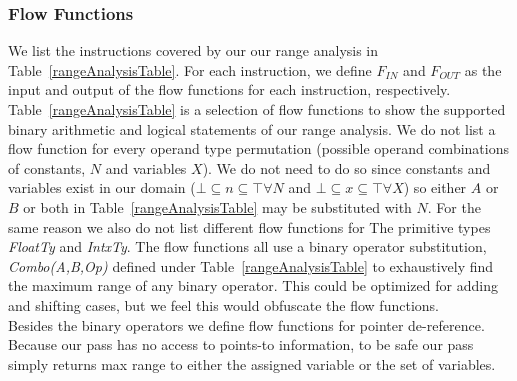\subsubsection{Flow Functions}
We list the instructions covered by our our range analysis in Table~\ref{rangeAnalysisTable}. For each instruction, we define $F_{IN}$ and $F_{OUT}$ as the input and output of the flow functions for each instruction, respectively. Table~\ref{rangeAnalysisTable} is a selection of flow functions to show the supported binary arithmetic and logical statements of our range analysis. We do not list a flow function for every operand type permutation (possible operand combinations of constants, $N$ and variables $X$). We do not need to do so since constants and variables exist in our domain ($\bot \subseteq n \subseteq \top \forall N$ and $\bot \subseteq x \subseteq \top \forall X$) so either $A$ or $B$ or both in Table~\ref{rangeAnalysisTable} may be substituted with $N$. For the same reason we also do not list different flow functions for The primitive types \emph{FloatTy} and \emph{IntxTy}. The flow functions all use a binary operator substitution, \emph{Combo(A,B,Op)} defined under Table~\ref{rangeAnalysisTable} to exhaustively find the maximum range of any binary operator. This could be optimized for adding and shifting cases, but we feel this would obfuscate the flow functions.\\
Besides the binary operators we define flow functions for pointer de-reference. Because our pass has no access to points-to information, to be safe our pass simply returns max range to either the assigned variable or the set of variables.  %

